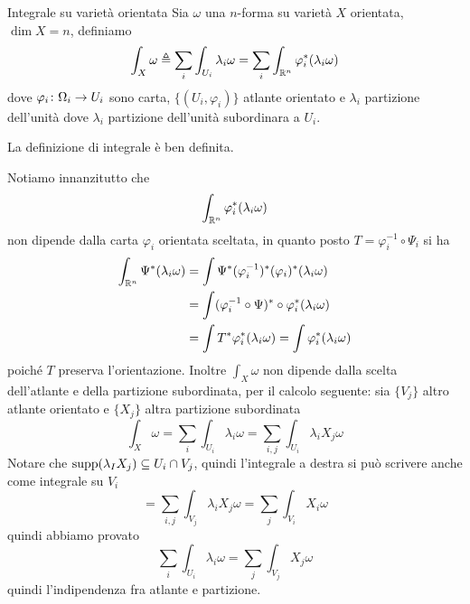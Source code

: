 \documentclass[a4paper]{article}
\begin{document}
\begin{snippetdefinition}{Integrale su varietà orientata}
    Sia \(\omega\) una \(n\)-forma su varietà \(X\)
    orientata, \(\dim X = n\), definiamo \[
        \int_X \omega \triangleq \sum_i \int_{U_i} \lambda_i \omega
        = \sum_i \int_{\mathbb{R}^n} \varphi_i^\ast(\lambda_i \omega)
    \]
    dove \(\varphi_i \colon \Omega_i \to U_i\) sono carta, \(\{(U_i, \varphi_i)\}\)
    atlante orientato e \(\lambda_i\) partizione dell'unità
    dove \(\lambda_i\) partizione dell'unità subordinara a \(U_i\).
\end{snippetdefinition}

\begin{snippetproposition}{}
    La definizione di integrale è ben definita.
\end{snippetproposition}

\begin{snippetproof}{}
    Notiamo innanzitutto che
    \[
        \int_{\mathbb{R}^n} \varphi_i^\ast(\lambda_i\omega)
    \]
    non dipende dalla carta \(\varphi_i\) orientata sceltata, in quanto
    posto \(T = \varphi_i^{-1} \circ \Psi_i\) si ha
    \begin{align*}
        \int_{\mathbb{R}^n} \Psi^\ast(\lambda_i\omega)
        &= \int \Psi^\ast(\varphi_i^{-1})^\ast (\varphi_i)^\ast (\lambda_i \omega)\\
        &= \int(\varphi_i^{-1} \circ \Psi)^\ast \circ \varphi_i^\ast(\lambda_i \omega) \\
        &= \int T^\ast \varphi_i^\ast(\lambda_i \omega) = \int \varphi_i^\ast(\lambda_i \omega)
    \end{align*}
    poiché \(T\) preserva l'orientazione.
    Inoltre \(\int_X \omega\) non dipende dalla scelta dell'atlante e della partizione subordinata, per il calcolo
    seguente: sia \(\{V_j\}\) altro atlante orientato e \(\{X_j\}\) altra partizione subordinata
    \[
        \int_X \omega = \sum_i \int_{U_i} \lambda_i \omega = \sum_{i,j}
        \int_{U_i} \lambda_i X_j \omega
    \]
    Notare che \(\operatorname{supp}(\lambda_I X_j) \subseteq U_i \cap V_j\),
    quindi l'integrale a destra si può scrivere anche come integrale su \(V_i\)
    \[
        = \sum_{i,j} \int_{V_j} \lambda_i X_j \omega
        = \sum_j \int_{V_i} X_i \omega
    \]
    quindi abbiamo provato \[
        \sum_i \int_{U_i} \lambda_i \omega = \sum_j \int_{V_j} X_j \omega
    \]
    quindi l'indipendenza fra atlante e partizione.
\end{snippetproof}
\end{document}
